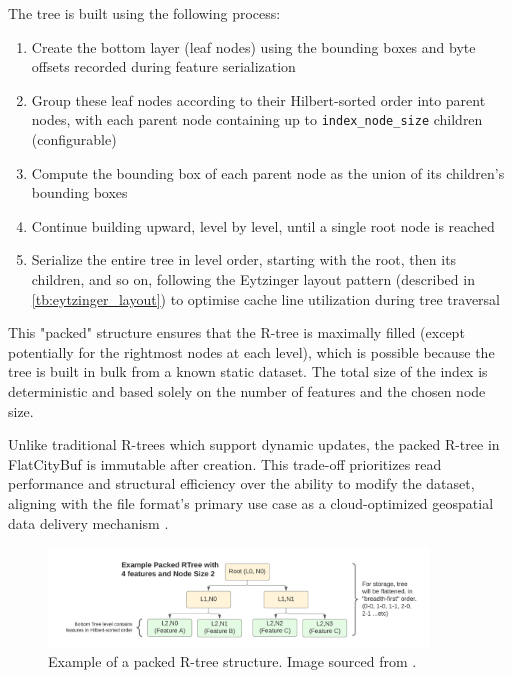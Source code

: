 The tree is built using the following process:

\begin{enumerate}
  \item Create the bottom layer (leaf nodes) using the bounding boxes and byte offsets recorded during feature serialization
  \item Group these leaf nodes according to their Hilbert-sorted order into parent nodes, with each parent node containing up to \texttt{index\_node\_size} children (configurable)
  \item Compute the bounding box of each parent node as the union of its children's bounding boxes
  \item Continue building upward, level by level, until a single root node is reached
  \item Serialize the entire tree in level order, starting with the root, then its children, and so on, following the Eytzinger layout pattern (described in \autoref{tb:eytzinger_layout}) to optimise cache line utilization during tree traversal
\end{enumerate}

This "packed" structure ensures that the R-tree is maximally filled (except potentially for the rightmost nodes at each level), which is possible because the tree is built in bulk from a known static dataset. The total size of the index is deterministic and based solely on the number of features and the chosen node size.

Unlike traditional R-trees which support dynamic updates, the packed R-tree in FlatCityBuf is immutable after creation. This trade-off prioritizes read performance and structural efficiency over the ability to modify the dataset, aligning with the file format's primary use case as a cloud-optimized geospatial data delivery mechanism \citep{horance_2022_overview}.

\begin{figure}[ht]
  \centering
  \includegraphics[width=0.9\textwidth]{./figs/methodology/packed_rtree.png}
  \caption{Example of a packed R-tree structure. Image sourced from \cite{horance_2022_overview}.}
  \label{fig:packed_rtree}
\end{figure}
